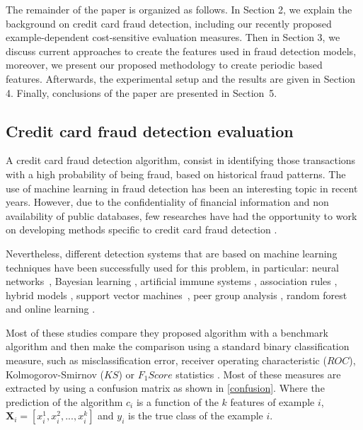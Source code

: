 	The remainder of the paper is organized as follows. In Section 2, we explain the 
	background on credit card fraud detection, including our recently proposed example-dependent 
	cost-sensitive evaluation measures. Then in Section 3, we discuss current 	approaches to create 
	the features used in fraud detection models, moreover, we present our 	proposed methodology to 
	create periodic based features. Afterwards, the experimental setup and 	the results are given in 
	Section 4. Finally, conclusions of the paper are presented in 	\mbox{Section 5}. 

\subsection{Credit card fraud detection evaluation}
\label{sec:4:frad:eval}

	A credit card fraud detection algorithm, consist in identifying those transactions with a 
	high probability of being fraud, based on historical fraud patterns. 
  The use of machine learning in fraud detection has been an interesting topic in recent years. 
	However, due to the confidentiality of financial information and non availability of public 
	databases, few researches have had the opportunity to work on developing methods specific 
	to credit card fraud detection \citep{Bolton2002,DalPozzolo2014}.
	
	Nevertheless, different detection systems that are based on machine learning 
	techniques have been successfully used for this problem, in particular: neural 
	networks~\citep{Maes2002}, Bayesian learning \citep{Maes2002}, artificial immune systems 
	\citep{Gadi2008}, association rules \citep{Sanchez2009}, hybrid models \citep{Krivko2010}, 
	support vector machines~\citep{Bhattacharyya2011}, peer group  analysis \citep{Weston2008}, 
	random forest~\citep{CorreaBahnsen2013} and online learning \citep{DalPozzolo2014}.

  Most of these studies compare they proposed algorithm with a benchmark algorithm and then make 
	the comparison using a standard binary classification measure, such as misclassification error, 
	receiver operating characteristic ($ROC$), Kolmogorov-Smirnov ($KS$) or \mbox{$F_1Score$} 
	statistics \citep{Bolton2002,Hand2007a,DalPozzolo2014}. Most of these measures are extracted by 
	using a confusion matrix as shown in \tablename{ \ref{confusion}}. Where the prediction of the 
	algorithm $c_i$ is a function of  the $k$ features of example $i$, \mbox{$\mathbf{X}_i=[x_i^1, 
	x_i^2,...,x_i^k]$} and $y_i$ is the true class of the example $i$.

